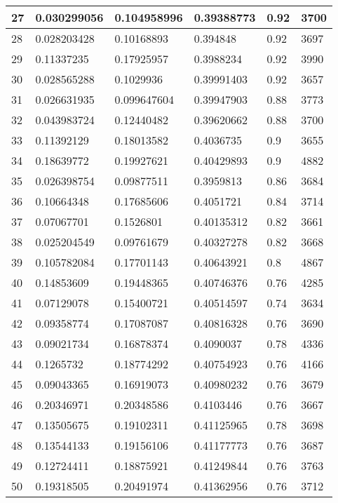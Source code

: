 \begin{longtable}{|l|l|l|l|l|l|}
27 & 0.030299056 & 0.104958996 & 0.39388773 & 0.92 & 3700 \\ \hline 
28 & 0.028203428 & 0.10168893 & 0.394848 & 0.92 & 3697 \\ \hline 
29 & 0.11337235 & 0.17925957 & 0.3988234 & 0.92 & 3990 \\ \hline 
30 & 0.028565288 & 0.1029936 & 0.39991403 & 0.92 & 3657 \\ \hline 
31 & 0.026631935 & 0.099647604 & 0.39947903 & 0.88 & 3773 \\ \hline 
32 & 0.043983724 & 0.12440482 & 0.39620662 & 0.88 & 3700 \\ \hline 
33 & 0.11392129 & 0.18013582 & 0.4036735 & 0.9 & 3655 \\ \hline 
34 & 0.18639772 & 0.19927621 & 0.40429893 & 0.9 & 4882 \\ \hline 
35 & 0.026398754 & 0.09877511 & 0.3959813 & 0.86 & 3684 \\ \hline 
36 & 0.10664348 & 0.17685606 & 0.4051721 & 0.84 & 3714 \\ \hline 
37 & 0.07067701 & 0.1526801 & 0.40135312 & 0.82 & 3661 \\ \hline 
38 & 0.025204549 & 0.09761679 & 0.40327278 & 0.82 & 3668 \\ \hline 
39 & 0.105782084 & 0.17701143 & 0.40643921 & 0.8 & 4867 \\ \hline 
40 & 0.14853609 & 0.19448365 & 0.40746376 & 0.76 & 4285 \\ \hline 
41 & 0.07129078 & 0.15400721 & 0.40514597 & 0.74 & 3634 \\ \hline 
42 & 0.09358774 & 0.17087087 & 0.40816328 & 0.76 & 3690 \\ \hline 
43 & 0.09021734 & 0.16878374 & 0.4090037 & 0.78 & 4336 \\ \hline 
44 & 0.1265732 & 0.18774292 & 0.40754923 & 0.76 & 4166 \\ \hline 
45 & 0.09043365 & 0.16919073 & 0.40980232 & 0.76 & 3679 \\ \hline 
46 & 0.20346971 & 0.20348586 & 0.4103446 & 0.76 & 3667 \\ \hline 
47 & 0.13505675 & 0.19102311 & 0.41125965 & 0.78 & 3698 \\ \hline 
48 & 0.13544133 & 0.19156106 & 0.41177773 & 0.76 & 3687 \\ \hline 
49 & 0.12724411 & 0.18875921 & 0.41249844 & 0.76 & 3763 \\ \hline 
50 & 0.19318505 & 0.20491974 & 0.41362956 & 0.76 & 3712 \\ \hline 
\end{longtable}